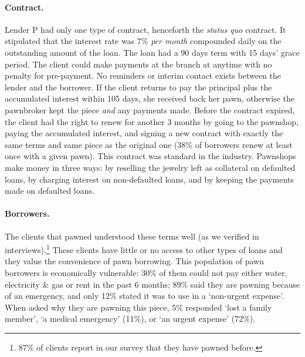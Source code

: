 \documentclass[oneside,11pt]{article}
\begin{document}
\paragraph{Contract.} Lender P had only one type of contract, henceforth the \textit{status quo} contract. It stipulated that the interest rate was 7\% \textit{per month} compounded daily on the outstanding amount of the loan. The loan had a 90 days term with 15 days' grace period. The client could make payments at the branch at anytime with no penalty for pre-payment. No reminders or interim contact exists between the lender and the borrower. If the client returns to pay the principal plus the accumulated interest within 105 days, she received back her pawn, otherwise the pawnbroker kept the piece \textit{and} any payments made. Before the contract expired, the client had the right to renew for another 3 months by going to the pawnshop, paying the accumulated interest, and signing a new contract with exactly the same terms and same piece as the original one (38\% of borrowers renew at least once with a given pawn). This contract was standard in the industry.  Pawnshops make money in three ways: by reselling the jewelry left as collateral on defaulted loans, by charging interest on non-defaulted loans, and by keeping the payments made on defaulted loans. 

\paragraph{Borrowers.} The clients that pawned understood these terms well (as we verified in interviews).\footnote{87\% of clients report in our survey that they have pawned before.} These clients have little or no access to other types of loans and they value the convenience of pawn borrowing.  This population of pawn borrowers is economically vulnerable:  30\% of them could not pay either water, electricity \& gas or rent in the past 6 months; 89\% said they are pawning because of an emergency, and only 12\% stated it was to use in a `non-urgent expense'.  When asked why they are pawning this piece, 5\% responded `lost a family member', `a medical emergency' (11\%), or `an urgent expense' (72\%).
\end{document}
